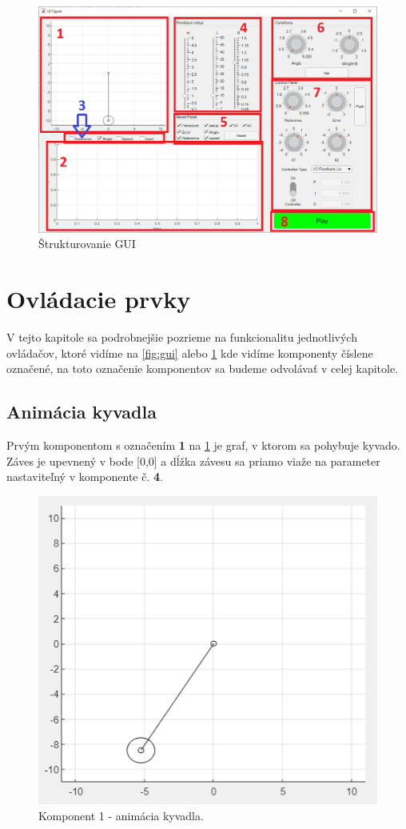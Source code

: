 \begin{figure}[t!]
	\centering
	\includegraphics[width=0.9\linewidth]{structgui}
	\caption{Štrukturovanie GUI}
	\label{fig:structgui}
\end{figure}
 
 
\clearpage
\section{Ovládacie prvky}
 V tejto kapitole sa podrobnejšie pozrieme na funkcionalitu jednotlivých ovládačov, ktoré vidíme na \cref{fig:gui}  alebo \cref{fig:structgui} kde vidíme komponenty číslene označené, na toto označenie komponentov sa budeme odvolávať v celej kapitole. 
 \subsection{Animácia kyvadla} 
 Prvým komponentom  s označením \textbf{1} na \cref{fig:structgui} je graf, v ktorom sa pohybuje kyvado. Záves je upevnený v bode [0,0] a dĺžka závesu sa priamo viaže na parameter nastaviteľný v komponente č. \textbf{4}.
 	\begin{figure}[h!]
 	\centering
 	\includegraphics[width=0.9\linewidth]{kyv}
 	\caption{Komponent 1 - animácia kyvadla.}
 	\label{fig:kyv}
 \end{figure}

